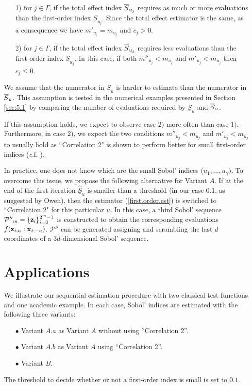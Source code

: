 \begin{itemize}
\item[1)] for $j \in \Gamma$, if the total effect index $\ov{$S$}_{u_j}$ requires as much or more evaluations than the first-order index $\underline{S}_{u_j}$. Since the total effect estimator is the same, as a consequence we have $m'_{u_j}=m_{u_j}$ and $c_j >0$.
\item[2)] for $j \in \Gamma$, if the total effect index $\ov{$S$}_{u_j}$ requires less evaluations than the first-order index $\underline{S}_{u_j}$. In this case, if both $m''_{u_j} < m_{u_j}$ and $m'_{u_j} < m_{u_j}$ then $c_j \leq 0$.  
\end{itemize}
{\color{purple} We assume that the numerator in $\underline{S}_u$ is harder to estimate than the numerator in $\ov{$S$}_u$. This assumption is tested in the numerical examples presented in Section \ref{sec:5.1} by comparing the number of evaluations required by $\underline{S}_u$ and $\ov{$S$}_u$. 

If this assumption holds, we expect to observe case $2)$ more often than case $1)$. Furthermore, in case $2)$, we expect the two conditions $m''_{u_j} < m_{u_j}$ and $m'_{u_j} < m_{u_j}$ to usually hold as ``Correlation 2" is shown to perform better for small first-order indices (\textit c.f. \cite{Owen}).}
\bigskip

In practice, one does not know which are the small Sobol' indices ($u_1,\dots,u_\gamma)$. To overcome this issue, we propose the following alternative for Variant $A$. {\color{purple} If at the end of the first iteration $\widehat{\underline{S}}_u$ is smaller than a threshold (in our case $0.1$, as suggested by Owen), then the estimator (\ref{first.order.est}) is switched to ``Correlation 2" for this particular $u$. In this case, a third Sobol' sequence $\mathcal{P''}_{m}=\{\boldsymbol{\mathbf{z}}_i\}_{i=0}^{2^m-1}$ is constructed to obtain the corresponding evaluations $f({\boldsymbol{\mathbf{z}}}_{i,u}:{\boldsymbol{\mathbf{x}}}_{i,-u})$. $\mathcal{P''}$ can be generated assigning and scrambling the last $d$ coordinates of a $3d$-dimensional Sobol' sequence.}

\section{Applications}
\label{sec:5}

We illustrate our sequential estimation procedure with two classical test functions and one academic example. In each case, Sobol' indices are estimated with the following three variants:
\begin{itemize}
\item[$\bullet$] Variant $A.a$ as Variant $A$ without using ``Correlation 2''. 
\item[$\bullet$] Variant $A.b$ as Variant $A$ using ``Correlation 2''.
\item[$\bullet$] Variant $B$.
\end{itemize}
The threshold to decide whether or not a first-order index is small is set to $0.1$. 


